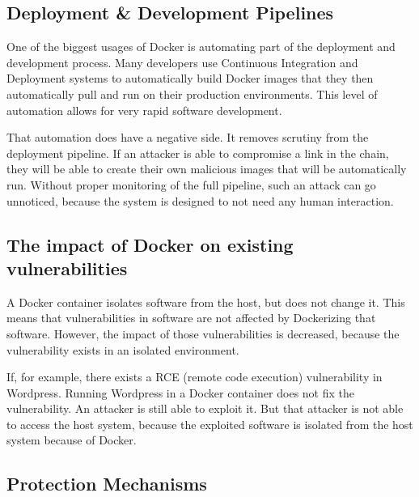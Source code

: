 \subsection{Deployment \& Development Pipelines}
One of the biggest usages of Docker is automating part of the deployment and development process. Many developers use Continuous Integration and Deployment systems to automatically build Docker images that they then automatically pull and run on their production environments. This level of automation allows for very rapid software development.

That automation does have a negative side. It removes scrutiny from the deployment pipeline. If an attacker is able to compromise a link in the chain, they will be able to create their own malicious images that will be automatically run. Without proper monitoring of the full pipeline, such an attack can go unnoticed, because the system is designed to not need any human interaction.

\subsection{The impact of Docker on existing vulnerabilities}
A Docker container isolates software from the host, but does not change it. This means that vulnerabilities in software are not affected by Dockerizing that software. However, the impact of those vulnerabilities is decreased, because the vulnerability exists in an isolated environment.

If, for example, there exists a RCE (remote code execution) vulnerability in Wordpress. Running Wordpress in a Docker container does not fix the vulnerability. An attacker is still able to exploit it. But that attacker is not able to access the host system, because the exploited software is isolated from the host system because of Docker.

\subsection{Protection Mechanisms}
